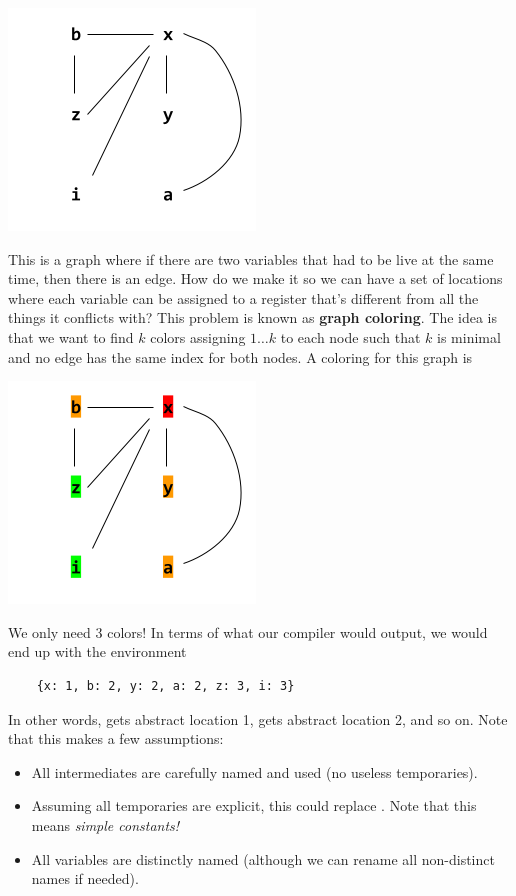 \begin{center}
    \includegraphics[scale=0.6]{assets/loc_use1.png}
\end{center}
This is a graph where if there are two variables that had to be live at the same time, then there is an edge. How do we make it so we can have a set of locations where each variable can be assigned to a register that's different from all the things it conflicts with? This problem is known as \textbf{graph coloring}. The idea is that we want to find $k$ colors assigning $1 \hdots k$ to each node such that $k$ is minimal and no edge has the same index for both nodes. A coloring for this graph is 
\begin{center}
    \includegraphics[scale=0.6]{assets/loc_use2.png}
\end{center}
We only need 3 colors! In terms of what our compiler would output, we would end up with the environment 
\begin{verbatim}
    {x: 1, b: 2, y: 2, a: 2, z: 3, i: 3}\end{verbatim}
In other words,  gets abstract location 1,  gets abstract location 2, and so on. Note that this makes a few assumptions: 
\begin{itemize}
    \item All intermediates are carefully named and used (no useless temporaries).
    \item Assuming all temporaries are explicit, this could replace . Note that this means \emph{simple constants!}
    \item All variables are distinctly named (although we can rename all non-distinct names if needed).
\end{itemize}

